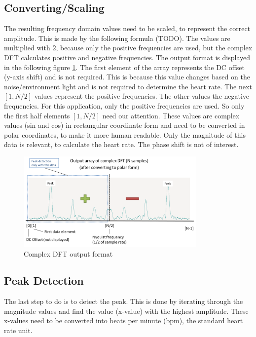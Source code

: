 \documentclass[notitlepage]{scrreprt}
\begin{document}
\subsection{Converting/Scaling}
The resulting frequency domain values need to be scaled, to represent the correct amplitude. This is made by the following formula (TODO). The values are multiplied with $2$, because only the positive frequencies are used, but the complex DFT calculates positive and negative frequencies. The output format is displayed in the following figure \ref{fig:output-format}. The first element of the array represents the DC offset (y-axis shift) and is not required. This is because this value changes based on the noise/environment light and is not required to determine the heart rate. The next $[1, N/2]$ values represent the positive frequencies. The other values the negative frequencies. For this application, only the positive frequencies are used. So only the first half elements $[1, N/2]$ need our attention. These values are complex values (sin and cos) in rectangular coordinate form and need to be converted in polar coordinates, to make it more human readable. Only the magnitude of this data is relevant, to calculate the heart rate. The phase shift is not of interest.

\begin{figure}[H]
	\centering
	\includegraphics[width=350px]{images/outputFormat.png}
	\caption{Complex DFT output format}
	\label{fig:output-format}
\end{figure}

\subsection{Peak Detection}
The last step to do is to detect the peak. This is done by iterating through the magnitude values and find the value (x-value) with the highest amplitude. These x-values need to be converted into beats per minute (bpm), the standard heart rate unit.
\end{document}
